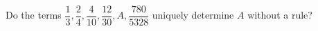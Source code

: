 Do the terms $\dfrac{1}{3},\dfrac{2}{4},\dfrac{4}{10},\dfrac{12}{30},A,\dfrac{780}{5328}$ uniquely determine $A$ without a rule?
